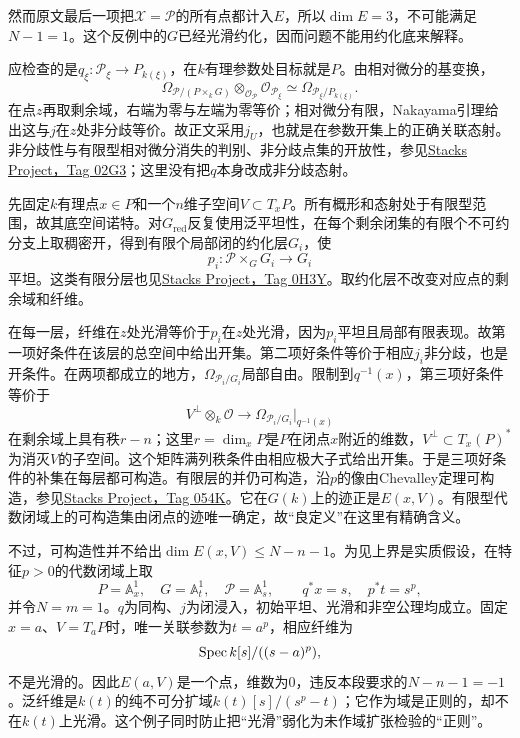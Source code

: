 然而原文最后一项把$\mathcal X=\mathcal P$的所有点都计入$E$，所以$\dim E=3$，不可能满足$N-1=1$。这个反例中的$G$已经光滑约化，因而问题不能用约化底来解释。

应检查的是$q_\xi:\mathcal P_\xi\to P_{k(\xi)}$，在$k$有理参数处目标就是$P$。由相对微分的基变换，
\[
\Omega_{\mathcal P/(P\times_kG)}
   \otimes_{\mathcal O_{\mathcal P}}\mathcal O_{\mathcal P_\xi}
\simeq
\Omega_{\mathcal P_\xi/P_{k(\xi)}}.
\]
在点$z$再取剩余域，右端为零与左端为零等价；相对微分有限，Nakayama引理给出这与$j$在$z$处非分歧等价。故正文采用$j_U$，也就是在参数开集上的正确关联态射。非分歧性与有限型相对微分消失的判别、非分歧点集的开放性，参见\href{https://stacks.math.columbia.edu/tag/02G3}{Stacks Project，Tag 02G3}；这里没有把$q$本身改成非分歧态射。

先固定$k$有理点$x\in P$和一个$n$维子空间$V\subset T_xP$。所有概形和态射处于有限型范围，故其底空间诺特。对$G_{\mathrm{red}}$反复使用泛平坦性，在每个剩余闭集的有限个不可约分支上取稠密开，得到有限个局部闭的约化层$G_i$，使
\[
p_i:\mathcal P\times_GG_i\longrightarrow G_i
\]
平坦。这类有限分层也见\href{https://stacks.math.columbia.edu/tag/0H3Y}{Stacks Project，Tag 0H3Y}。取约化层不改变对应点的剩余域和纤维。

在每一层，纤维在$z$处光滑等价于$p_i$在$z$处光滑，因为$p_i$平坦且局部有限表现。故第一项好条件在该层的总空间中给出开集。第二项好条件等价于相应$j_i$非分歧，也是开条件。在两项都成立的地方，$\Omega_{\mathcal P_i/G_i}$局部自由。限制到$q^{-1}(x)$，第三项好条件等价于
\[
V^\perp\otimes_k\mathcal O
\longrightarrow \Omega_{\mathcal P_i/G_i}\big|_{q^{-1}(x)}
\]
在剩余域上具有秩$r-n$；这里$r=\dim_x P$是$P$在闭点$x$附近的维数，$V^\perp\subset T_x(P)^*$为消灭$V$的子空间。这个矩阵满列秩条件由相应极大子式给出开集。于是三项好条件的补集在每层都可构造。有限层的并仍可构造，沿$p$的像由Chevalley定理可构造，参见\href{https://stacks.math.columbia.edu/tag/054K}{Stacks Project，Tag 054K}。它在$G(k)$上的迹正是$E(x,V)$。有限型代数闭域上的可构造集由闭点的迹唯一确定，故“良定义”在这里有精确含义。

不过，可构造性并不给出$\dim E(x,V)\leq N-n-1$。为见上界是实质假设，在特征$p>0$的代数闭域上取
\[
P=\mathbb A^1_x,\quad G=\mathbb A^1_t,\quad
\mathcal P=\mathbb A^1_s,\qquad q^*x=s,\quad p^*t=s^p,
\]
并令$N=m=1$。$q$为同构、$j$为闭浸入，初始平坦、光滑和非空公理均成立。固定$x=a$、$V=T_aP$时，唯一关联参数为$t=a^p$，相应纤维为
\[
\operatorname{Spec} k[s]/((s-a)^p),
\]
不是光滑的。因此$E(a,V)$是一个点，维数为0，违反本段要求的$N-n-1=-1$。泛纤维是$k(t)$的纯不可分扩域$k(t)[s]/(s^p-t)$；它作为域是正则的，却不在$k(t)$上光滑。这个例子同时防止把“光滑”弱化为未作域扩张检验的“正则”。

